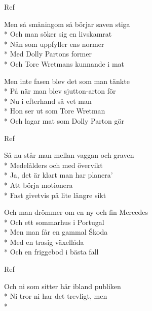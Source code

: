 \begin{SongVerse}[Pessemistkonsulten]
\begin{SongVerse}
    \end{SongVerse}
    \begin{SongVerse}
        Ref
    \end{SongVerse}
    \begin{SongVerse}
        Men så småningom så börjar saven stiga\\*%
        Och man söker sig en livskamrat\\*%
        Nån som uppfyller ens normer\\*%
        Med Dolly Partons former\\*%
        Och Tore Wretmans kunnande i mat
    \end{SongVerse}
    \begin{SongVerse}
        Men inte fasen blev det som man tänkte\\*%
        På när man blev sjutton-arton för\\*%
        Nu i efterhand så vet man\\*%
        Hon ser ut som Tore Wretman\\*%
        Och lagar mat som Dolly Parton gör
    \end{SongVerse}
    \begin{SongVerse}
        Ref
    \end{SongVerse}
    \begin{SongVerse}
        Så nu står man mellan vaggan och graven\\*%
        Medelålders och med övervikt\\*%
        Ja, det är klart man har planera'\\*%
        Att börja motionera\\*%
        Fast givetvis på lite längre sikt
    \end{SongVerse}
    \begin{SongVerse}
        Och man drömmer om en ny och fin Mercedes\\*%
        Och ett sommarhus i Portugal\\*%
        Men man får en gammal Škoda\\*%
        Med en trasig växellåda\\*%
        Och en friggebod i bästa fall
    \end{SongVerse}
    \begin{SongVerse}
        Ref
    \end{SongVerse}
    \begin{SongVerse}
        Och ni som sitter här ibland publiken\\*%
        Ni tror ni har det trevligt, men\\*%

\end{SongVerse}
\end{SongVerse}
